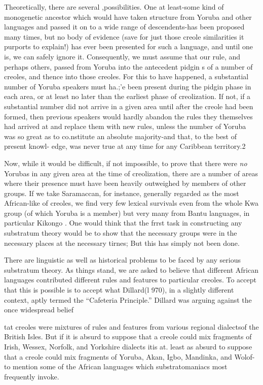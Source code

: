 Theoretically, there are several ,possibilities. One at least-some kind of monogenetic ancestor which would have taken structure from Yoruba and other languages and passed it on to a wide range of descen\-dents-has been proposed many times, but no body of evidence (save for just those creole similarities it purports to explain!) has ever been presented for such a language, and until one is, we can safely ignore it. Consequently, we must assume that our rule, and perhaps others, passed from Yoruba into the antecedent pidgin s of a number of creoles, and thence into those creoles. For this to have happened, a substantial number of Yoruba speakers must ha.;'e been present during the pidgin
phase in each area, or at least no later than the earliest phase of creoli\-zation. If not, if a substantial number did not arrive in a given area until after the creole had been formed, then previous speakers would hardly abandon the rules they themselves had arrived at and replace them with new rules, unless the number of Yoruba was so great as to co.nstitute an absolute majority-and that, to the best of present knowl- edge, was never true at any time for any Caribbean territory.2

Now, while it would be difficult, if not impossible, to prove that there were \textit{no} Yorubas in any given area at the time of creolization, there are a number of areas where their presence must have been heavily outweighed by members of other groups. If we take Sara\-maccan, for instance, generally regarded as the most African-like of creoles, we find very few lexical survivals even from the whole Kwa group (of which Yoruba is a member) but very many from Bantu lan\-guages, in particular Kikongo \citep{Daeleman1972}. One would think that the frrst task in constructing any substratum theory would be to show that the necessary groups were in the necessary places at the necessary tirnes; But this has simply not been done.

There are linguistic as well as historical problems to be faced by any serious substratum theory. As things stand, we are asked to believe that different African languages contributed different rules and features to particular creoles. To accept that this is possible is to accept what Dillard(l 970), in a slightly different context, aptly termed the ``Cafe\-teria Principle.'' Dillard was arguing against the once widespread belief

tat creoles were mixtures of rules and features from various regional dialectsof the British Isles. But if it is absurd to suppose that a creole could mix fragments of Irish, Wessex, Norfolk, and Yorkshire dialects itis at. least as absurd to suppose that a creole could mix fragments of  Yoruba, Akan, Igbo, Mandinka, and Wolof-to mention some of the African languages which substratomaniacs most frequently invoke.


